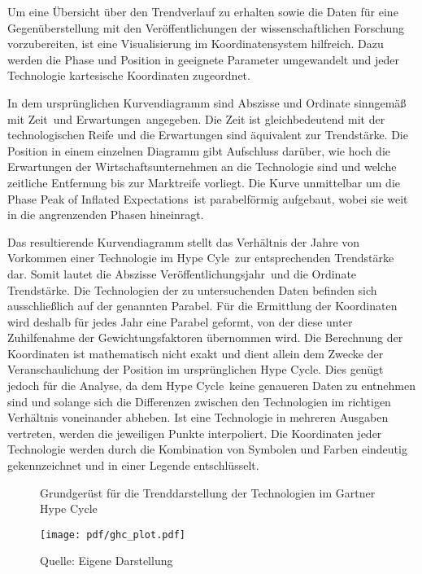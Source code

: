 Um eine Übersicht über den Trendverlauf zu erhalten sowie die Daten für eine Gegenüberstellung mit den Veröffentlichungen der wissenschaftlichen Forschung vorzubereiten, ist eine Visualisierung im Koordinatensystem hilfreich. Dazu werden die Phase und Position in geeignete Parameter umgewandelt und jeder Technologie kartesische Koordinaten zugeordnet.

In dem ursprünglichen Kurvendiagramm sind Abszisse und Ordinate sinngemäß mit \glqq Zeit\grqq~und \glqq Erwartungen\grqq~angegeben. Die Zeit ist gleichbedeutend mit der technologischen Reife und die Erwartungen sind äquivalent zur Trendstärke. Die Position in einem einzelnen Diagramm gibt Aufschluss darüber, wie hoch die Erwartungen der Wirtschaftsunternehmen an die Technologie sind und welche zeitliche Entfernung bis zur Marktreife vorliegt. Die Kurve unmittelbar um die Phase \glqq Peak of Inflated Expectations\grqq~ist parabelförmig aufgebaut, wobei sie weit in die angrenzenden Phasen hineinragt.

Das resultierende Kurvendiagramm stellt das Verhältnis der Jahre von Vorkommen einer Technologie im \glqq Hype Cyle\grqq~zur entsprechenden Trendstärke dar. Somit lautet die Abszisse \glqq Veröffentlichungsjahr\grqq~und die Ordinate \glqq Trendstärke\grqq. Die Technologien der zu untersuchenden Daten befinden sich ausschließlich auf der genannten Parabel. Für die Ermittlung der Koordinaten wird deshalb für jedes Jahr eine Parabel geformt, von der diese unter Zuhilfenahme der Gewichtungsfaktoren übernommen wird. Die Berechnung der Koordinaten ist mathematisch nicht exakt und dient allein dem Zwecke der Veranschaulichung der Position im ursprünglichen \glqq Hype Cycle\grqq. Dies genügt jedoch für die Analyse, da dem \glqq Hype Cycle\grqq~keine genaueren Daten zu entnehmen sind und solange sich die Differenzen zwischen den Technologien im richtigen Verhältnis voneinander abheben. Ist eine Technologie in mehreren Ausgaben vertreten, werden die jeweiligen Punkte interpoliert. Die Koordinaten jeder Technologie werden durch die Kombination von Symbolen und Farben eindeutig gekennzeichnet und in einer Legende entschlüsselt.

\begin{figure}
	\centering
	\caption{Grundgerüst für die Trenddarstellung der Technologien im \glqq Gartner Hype Cycle\grqq}
	\texttt{[image: pdf/ghc\_plot.pdf]}
	\caption*{Quelle: Eigene Darstellung}
	\label{fig:ghc_plot}
\end{figure}

